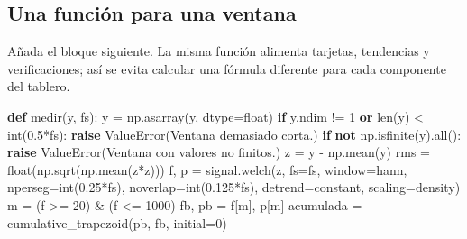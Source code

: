 \documentclass[
  spanish,
  10.5pt,
  a4paper,
  DIV=11,
  numbers=noendperiod]{scrartcl}
\newenvironment{Shaded}{\begin{snugshade}}{\end{snugshade}}
\newcommand{\BuiltInTok}[1]{\textcolor[rgb]{0.00,0.23,0.31}{#1}}
\newcommand{\ControlFlowTok}[1]{\textcolor[rgb]{0.00,0.23,0.31}{\textbf{#1}}}
\newcommand{\DecValTok}[1]{\textcolor[rgb]{0.68,0.00,0.00}{#1}}
\newcommand{\FloatTok}[1]{\textcolor[rgb]{0.68,0.00,0.00}{#1}}
\newcommand{\KeywordTok}[1]{\textcolor[rgb]{0.00,0.23,0.31}{\textbf{#1}}}
\newcommand{\NormalTok}[1]{\textcolor[rgb]{0.00,0.23,0.31}{#1}}
\newcommand{\OperatorTok}[1]{\textcolor[rgb]{0.37,0.37,0.37}{#1}}
\newcommand{\PreprocessorTok}[1]{\textcolor[rgb]{0.68,0.00,0.00}{#1}}
\newcommand{\StringTok}[1]{\textcolor[rgb]{0.13,0.47,0.30}{#1}}
\begin{document}
\subsection{Una función para una
ventana}\label{una-funciuxf3n-para-una-ventana}

Añada el bloque siguiente. La misma función alimenta tarjetas,
tendencias y verificaciones; así se evita calcular una fórmula diferente
para cada componente del tablero.

\begin{Shaded}
\begin{Highlighting}[]
\KeywordTok{def}\NormalTok{ medir(y, fs):}
\NormalTok{    y }\OperatorTok{=}\NormalTok{ np.asarray(y, dtype}\OperatorTok{=}\BuiltInTok{float}\NormalTok{)}
    \ControlFlowTok{if}\NormalTok{ y.ndim }\OperatorTok{!=} \DecValTok{1} \KeywordTok{or} \BuiltInTok{len}\NormalTok{(y) }\OperatorTok{\textless{}} \BuiltInTok{int}\NormalTok{(}\FloatTok{0.5}\OperatorTok{*}\NormalTok{fs):}
        \ControlFlowTok{raise} \PreprocessorTok{ValueError}\NormalTok{(}\StringTok{\textquotesingle{}Ventana demasiado corta.\textquotesingle{}}\NormalTok{)}
    \ControlFlowTok{if} \KeywordTok{not}\NormalTok{ np.isfinite(y).}\BuiltInTok{all}\NormalTok{():}
        \ControlFlowTok{raise} \PreprocessorTok{ValueError}\NormalTok{(}\StringTok{\textquotesingle{}Ventana con valores no finitos.\textquotesingle{}}\NormalTok{)}
\NormalTok{    z }\OperatorTok{=}\NormalTok{ y }\OperatorTok{{-}}\NormalTok{ np.mean(y)}
\NormalTok{    rms }\OperatorTok{=} \BuiltInTok{float}\NormalTok{(np.sqrt(np.mean(z}\OperatorTok{*}\NormalTok{z)))}
\NormalTok{    f, p }\OperatorTok{=}\NormalTok{ signal.welch(z, fs}\OperatorTok{=}\NormalTok{fs, window}\OperatorTok{=}\StringTok{\textquotesingle{}hann\textquotesingle{}}\NormalTok{,}
\NormalTok{                        nperseg}\OperatorTok{=}\BuiltInTok{int}\NormalTok{(}\FloatTok{0.25}\OperatorTok{*}\NormalTok{fs),}
\NormalTok{                        noverlap}\OperatorTok{=}\BuiltInTok{int}\NormalTok{(}\FloatTok{0.125}\OperatorTok{*}\NormalTok{fs),}
\NormalTok{                        detrend}\OperatorTok{=}\StringTok{\textquotesingle{}constant\textquotesingle{}}\NormalTok{, scaling}\OperatorTok{=}\StringTok{\textquotesingle{}density\textquotesingle{}}\NormalTok{)}
\NormalTok{    m }\OperatorTok{=}\NormalTok{ (f }\OperatorTok{\textgreater{}=} \DecValTok{20}\NormalTok{) }\OperatorTok{\&}\NormalTok{ (f }\OperatorTok{\textless{}=} \DecValTok{1000}\NormalTok{)}
\NormalTok{    fb, pb }\OperatorTok{=}\NormalTok{ f[m], p[m]}
\NormalTok{    acumulada }\OperatorTok{=}\NormalTok{ cumulative\_trapezoid(pb, fb, initial}\OperatorTok{=}\DecValTok{0}\NormalTok{)}

\end{Highlighting}
\end{Shaded}
\end{document}
